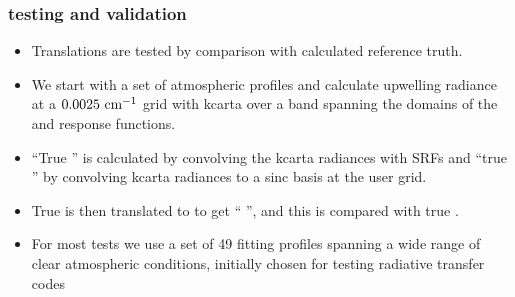 \documentclass[10pt]{beamer}
\begin{document}
\begin{frame}
\frametitle{testing and validation}
\begin{itemize}

  \item Translations are tested by comparison with calculated
    reference truth.

  \item We start with a set of atmospheric profiles and calculate
    upwelling radiance at a $0.0025~\mbox{cm$^{-1}$}$ grid with kcarta over a
    band spanning the domains of the {\airs} and {\cris} response
    functions.

  \item ``True {\airs}'' is calculated by convolving the kcarta
    radiances with {\airs} SRFs and ``true {\cris}'' by convolving
    kcarta radiances to a sinc basis at the {\cris} user grid.

  \item True {\airs} is then translated to {\cris} to get ``{\airs}
    {\cris}'', and this is compared with true {\cris}.

  \item For most tests we use a set of 49 fitting profiles spanning
    a wide range of clear atmospheric conditions, initially chosen
    for testing radiative transfer codes

\end{itemize}
\end{frame}
\end{document}

